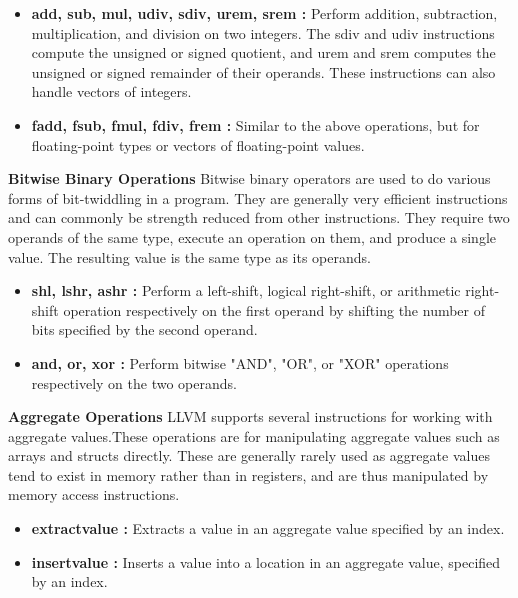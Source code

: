 \documentclass{book}
\begin{document}
	\begin{itemize}
		\item \textbf{add, sub,	mul, udiv, sdiv, urem, srem : }Perform addition, subtraction, multiplication, and division on two integers. The sdiv and udiv	instructions compute the  unsigned or signed quotient, and urem and srem computes  the  unsigned or	signed remainder of their operands. These instructions can also handle vectors of	integers.
		\item \textbf{fadd,	fsub, fmul, fdiv, frem : }Similar to the above operations, but for floating-point types or vectors of floating-point values.
	\end{itemize}

	\textbf{Bitwise Binary Operations} \newline \newline
	Bitwise binary operators are used to do various forms of bit-twiddling in a program. They are generally very efficient instructions and can commonly be strength reduced from other instructions. They require two operands of the same type, execute an operation on them, and produce a single value. The resulting value is the same type as its operands.
	
	\begin{itemize}
		\item \textbf{shl, lshr, ashr : } Perform a left-shift, logical right-shift, or arithmetic right-shift operation respectively on the first operand by shifting the number of bits specified by
		the second operand.
		\item \textbf{and, or, xor : } Perform bitwise "AND", "OR", or "XOR" operations respectively on the two operands.
	\end{itemize}

	\textbf{Aggregate Operations} \newline \newline
	LLVM supports several instructions for working with aggregate values.These operations are for manipulating aggregate values such as arrays and structs directly. These are generally rarely used as aggregate values tend to exist in memory rather	than in registers, and are thus manipulated by memory access instructions.
	
	\begin{itemize}
		\item \textbf{extractvalue : }Extracts a value in an aggregate value specified by an index.
		\item \textbf{insertvalue : } Inserts a value into a location in an aggregate value, specified by	an index.
	\end{itemize}
\end{document}
